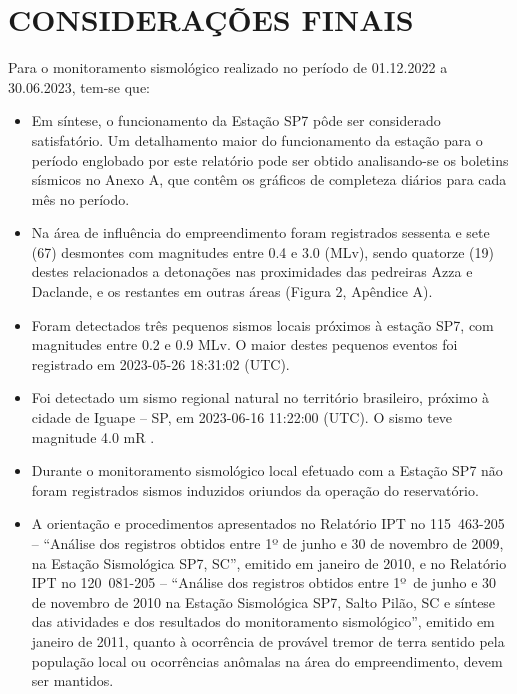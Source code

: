 \section{CONSIDERAÇÕES FINAIS}
\label{sec:consid_finais}

\par{Para o monitoramento sismológico realizado no período de 01.12.2022 a 30.06.2023, tem-se que:}

\begin{itemize}
    \item Em síntese, o funcionamento da Estação SP7 pôde ser considerado satisfatório. Um detalhamento maior do funcionamento da estação para o período englobado por este relatório pode ser obtido analisando-se os boletins sísmicos no Anexo A, que contêm os gráficos de completeza diários para cada mês no período.
    \item Na área de influência do empreendimento foram registrados sessenta e sete (67) desmontes com magnitudes entre 0.4 e 3.0 (MLv), sendo quatorze (19) destes relacionados a detonações nas proximidades das pedreiras Azza e Daclande, e os restantes em outras áreas (Figura 2, Apêndice A).
    \item Foram detectados três pequenos sismos locais próximos à estação SP7, com magnitudes entre 0.2 e 0.9 MLv. O maior destes pequenos eventos foi registrado em 2023-05-26 18:31:02 (UTC).
    \item Foi detectado um sismo regional natural no território brasileiro, próximo à cidade de Iguape – SP, em 2023-06-16 11:22:00 (UTC). O sismo teve magnitude 4.0 mR .
    \item Durante o monitoramento sismológico local efetuado com a Estação SP7 não foram registrados sismos induzidos oriundos da operação do reservatório. 
    \item A orientação e procedimentos apresentados no Relatório IPT no 115 463-205 – “Análise dos registros obtidos entre 1º de junho e 30 de novembro de 2009, na Estação Sismológica SP7, SC”, emitido em janeiro de 2010, e no Relatório IPT no 120 081-205 – “Análise dos registros obtidos entre 1º de junho e 30 de novembro de 2010 na Estação Sismológica SP7, Salto Pilão, SC e síntese das atividades e dos resultados do monitoramento sismológico”, emitido em janeiro de 2011, quanto à ocorrência de provável tremor de terra sentido pela população local ou ocorrências anômalas na área do empreendimento, devem ser mantidos.
\end{itemize}


